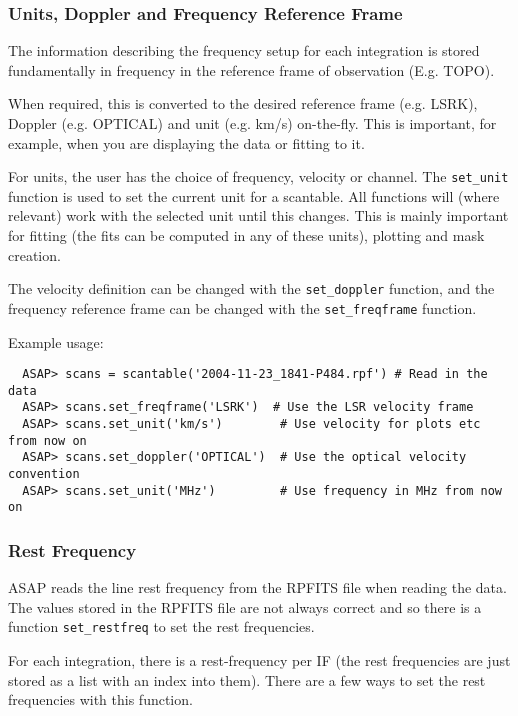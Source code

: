 \documentclass[11pt]{article}
\newcommand{\cmd}[1]{{\tt #1}}
\begin{document}
\subsubsection{Units, Doppler and Frequency Reference Frame}

The information describing the frequency setup for each integration
is stored fundamentally in frequency in the reference frame
of observation (E.g. TOPO).   

When required, this is converted to the desired reference frame
(e.g. LSRK), Doppler (e.g. OPTICAL) and unit (e.g. km/s) on-the-fly.
This is important, for example, when you are displaying the data or
fitting to it.

For units, the user has the choice of frequency, velocity or channel.
The \cmd{set\_unit} function is used to set the current unit for a
scantable. All functions will (where relevant) work with the selected
unit until this changes. This is mainly important for fitting (the fits
can be computed in any of these units), plotting and mask creation. 

The velocity definition can be changed with the \cmd{set\_doppler}
function, and the frequency reference frame can be changed with the
\cmd{set\_freqframe} function.

Example usage:

\begin{verbatim}
  ASAP> scans = scantable('2004-11-23_1841-P484.rpf') # Read in the data
  ASAP> scans.set_freqframe('LSRK')  # Use the LSR velocity frame
  ASAP> scans.set_unit('km/s')        # Use velocity for plots etc from now on
  ASAP> scans.set_doppler('OPTICAL')  # Use the optical velocity convention
  ASAP> scans.set_unit('MHz')         # Use frequency in MHz from now on
\end{verbatim}


\subsubsection{Rest Frequency}

ASAP reads the line rest frequency from the RPFITS file when reading
the data. The values stored in the RPFITS file are not always correct
and so there is a function \cmd{set\_restfreq} to set the rest frequencies.

For each integration, there is a rest-frequency per IF (the rest
frequencies are just stored as a list with an index into them).
There are a few ways to set the rest frequencies with this function.
\end{document}
